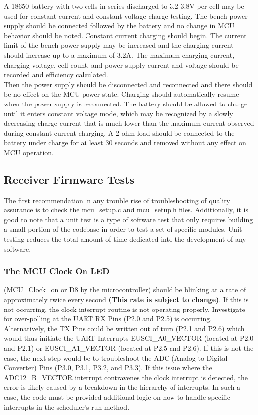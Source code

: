 \documentclass[12pt]{article}
\begin{document}
\indent
A 18650 battery with two cells in series discharged to 3.2-3.8V per cell may be used for constant current and constant voltage charge testing.  The bench power supply should be connected followed by the battery and no change in MCU behavior should be noted. Constant current charging should begin.  The current limit of the bench power supply may be increased and the charging current should increase up to a maximum of 3.2A. The maximum charging current, charging voltage, cell count, and power supply current and voltage should be recorded and efficiency calculated.\\

\indent Then the power supply should be disconnected and reconnected and there should be no effect on the MCU power state. Charging should automatically resume when the power supply is reconnected. The battery should be allowed to charge until it enters constant voltage mode, which may be recognized by a slowly decreasing charge current that is much lower than the maximum current observed during constant current charging.  A 2 ohm load should be connected to the battery under charge for at least 30 seconds and removed without any effect on MCU operation.

\subsection{Receiver Firmware Tests}

\indent
The first recommendation in any trouble rise of troubleshooting of quality assurance is to check the mcu\_setup.c and mcu\_setup.h files.  Additionally, it is good to note that a unit test is a type of software test that only requires building a small portion of the codebase in order to test a set of specific modules.  Unit testing reduces the total amount of time dedicated into the development of any software.

\subsubsection*{The MCU Clock On LED} (MCU\_Clock\_on or D8 by the microcontroller) should be blinking at a rate of approximately twice every second \textbf{(This rate is subject to change)}.  If this is not occurring, the clock interrupt routine is not operating properly.  Investigate for over-polling at the UART RX Pins (P2.0 and P2.5) is occurring.  Alternatively, the TX Pins could be written out of turn (P2.1 and P2.6) which would thus initiate the UART Interrupts EUSCI\_A0\_VECTOR (located at P2.0 and P2.1) or EUSCI\_A1\_VECTOR (located at P2.5 and P2.6).  If this is not the case, the next step would be to troubleshoot the ADC (Analog to Digital Converter) Pins (P3.0, P3.1, P3.2, and P3.3).  If this issue where the ADC12\_B\_VECTOR interrupt contravenes the clock interrupt is detected, the error is likely caused by a breakdown in the hierarchy of interrupts.  In such a case, the code must be provided additional logic on how to handle specific interrupts in the scheduler’s run method.
\end{document}
